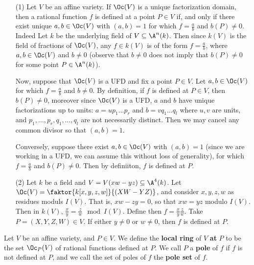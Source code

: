 \begin{example}\label{example_2.6}
  \begin{enumerate}
    \item[(1)] Let $V$ be an affine variety. If  $\Oc(V)$ is a unique
      factorization domain, then a rational function $f$ is defined at
      a point $P \in V$ if, and only if there exist unique $a,b \in
      \Oc(V)$ with $(a,b)=1$ for which $f=\frac{a}{b}$ and $b(P) \neq 0$.
      Indeed Let $k$ be the underlying field of  $V \subseteq \A^n(k)$.
      Then since $k(V)$ is the field of fractions of $\Oc(V)$, any $f
      \in k(V)$ is of the form $f=\frac{a}{b}$, where $a,b \in \Oc(V)$
      and $b \neq 0$ (observe that $b \neq 0$ does not imply that $b(P)
      \neq 0$ for some point $P \in \A^n(k)$).

      Now, suppose that  $\Oc(V)$ is a UFD and fix a point $P \in V$.
      Let $a,b \in \Oc(V)$ for which $f=\frac{a}{b}$ and $b \neq 0$. By
      definition, if  $f$ is defined at $P \in V$, then $b(P) \neq 0$,
      moreover since $\Oc(V)$ is a UFD, $a$ and $b$ have unique
      factorizations up to units: $a=up_1 \dots p_r$ and $b=vq_1
      \dots q_l$ where $u, v$ are units, and $p_1, \dots, p_r, q_1,
      \dots, q_l$ are not necessarily distinct. Then we may cancel any
      common divisor so that $(a,b)=1$.

      Conversely, suppose there exist $a,b \in \Oc(V)$ with $(a,b)=1$
      (since we are working in a UFD, we can assume this without loss of
      generality), for which $f=\frac{a}{b}$ and $b(P) \neq 0$. Then by
      definiiton, $f$ is defined at $P$.

    \item[(2)] Let $k$ be a field and $V=V(xw-yz) \subseteq \A^4(k)$. Let
      $\Oc(V)=\faktor{k[x,y,z,w]}{(XW-YZ)}$, and consider $x,y,z,w$ as
      residues moduls $I(V)$. That is, $xw-zy=0$, so that  $xw=yz$ modulo
      $I(V)$. Then in $k(V)$, $\frac{x}{y}=\frac{z}{w} \mod{I(V)}$.
      Define then $f=\frac{x}{y}\frac{z}{w}$. Take $P=(X,Y,Z,W) \in V$.
      If either $y \neq 0$ or $w \neq 0$, then $f$ is defined at  $P$.
  \end{enumerate}
\end{example}

\begin{definition}
  Let $V$ be an affine variety, and $P \in V$. We define the
  \textbf{local ring} of $V$ \textbf{at} $P$ to be the set  $\Oc_P(V)$
  of rational functions defined at $P$. We call $P$ a \textbf{pole} of
  $f$ if  $f$ is not defined at $P$, and we call the set of poles of
  $f$ the \textbf{pole set} of $f$.
\end{definition}

